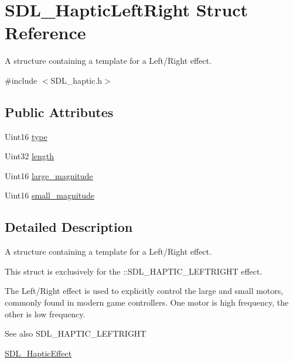 \hypertarget{structSDL__HapticLeftRight}{\section{S\+D\+L\+\_\+\+Haptic\+Left\+Right Struct Reference}
\label{structSDL__HapticLeftRight}
}


A structure containing a template for a Left/\+Right effect.  




{\ttfamily \#include $<$S\+D\+L\+\_\+haptic.\+h$>$}

\subsection*{Public Attributes}
\begin{DoxyCompactItemize}
\item 
Uint16 \hyperlink{structSDL__HapticLeftRight_abef79eeb482a8e623e512f0c9635e1a1}{type}
\item 
Uint32 \hyperlink{structSDL__HapticLeftRight_a5b942fee53f1ec77d3fb91a6e89b0196}{length}
\item 
Uint16 \hyperlink{structSDL__HapticLeftRight_a8cd16fe2200ef10cc4f3b4209adef959}{large\+\_\+magnitude}
\item 
Uint16 \hyperlink{structSDL__HapticLeftRight_aaa1f2c1e767a780e447d82efce6cd1cf}{small\+\_\+magnitude}
\end{DoxyCompactItemize}


\subsection{Detailed Description}
A structure containing a template for a Left/\+Right effect. 

This struct is exclusively for the \+::\+S\+D\+L\+\_\+\+H\+A\+P\+T\+I\+C\+\_\+\+L\+E\+F\+T\+R\+I\+G\+H\+T effect.

The Left/\+Right effect is used to explicitly control the large and small motors, commonly found in modern game controllers. One motor is high frequency, the other is low frequency.

\begin{DoxySeeAlso}{See also}
S\+D\+L\+\_\+\+H\+A\+P\+T\+I\+C\+\_\+\+L\+E\+F\+T\+R\+I\+G\+H\+T 

\hyperlink{unionSDL__HapticEffect}{S\+D\+L\+\_\+\+Haptic\+Effect} 
\end{DoxySeeAlso}


